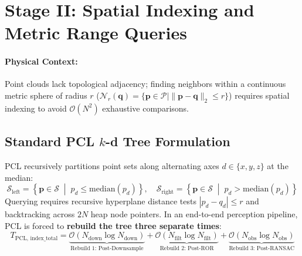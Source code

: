 \documentclass[11pt,a4paper]{article}
\begin{document}
\section{Stage II: Spatial Indexing and Metric Range Queries}
\label{sec:spatial_grid_math}

\paragraph{Physical Context:} Point clouds lack topological adjacency; finding neighbors within a continuous metric sphere of radius $r$ ($\mathcal{N}_r(\bm{q}) = \{ \bm{p} \in \mathcal{P} \mid \|\bm{p} - \bm{q}\|_2 \le r \}$) requires spatial indexing to avoid $\mathcal{O}(N^2)$ exhaustive comparisons.

\subsection{Standard PCL $k$-d Tree Formulation}
PCL recursively partitions point sets along alternating axes $d \in \{x, y, z\}$ at the median:
\begin{equation}
\mathcal{S}_{\text{left}} = \left\{ \bm{p} \in \mathcal{S} \;\middle|\; p_d \le \text{median}(p_d) \right\}, \quad \mathcal{S}_{\text{right}} = \left\{ \bm{p} \in \mathcal{S} \;\middle|\; p_d > \text{median}(p_d) \right\}
\label{eq:pcl_kdtree_split}
\end{equation}
Querying requires recursive hyperplane distance tests $|p_d - q_d| \le r$ and backtracking across $2N$ heap node pointers. In an end-to-end perception pipeline, PCL is forced to \textbf{rebuild the tree three separate times}:
\begin{equation}
T_{\text{PCL, index\_total}} = \underbrace{\mathcal{O}(N_{\text{down}} \log N_{\text{down}})}_{\text{Rebuild 1: Post-Downsample}} + \underbrace{\mathcal{O}(N_{\text{filt}} \log N_{\text{filt}})}_{\text{Rebuild 2: Post-ROR}} + \underbrace{\mathcal{O}(N_{\text{obs}} \log N_{\text{obs}})}_{\text{Rebuild 3: Post-RANSAC}}
\label{eq:pcl_triple_rebuild}
\end{equation}
\end{document}

